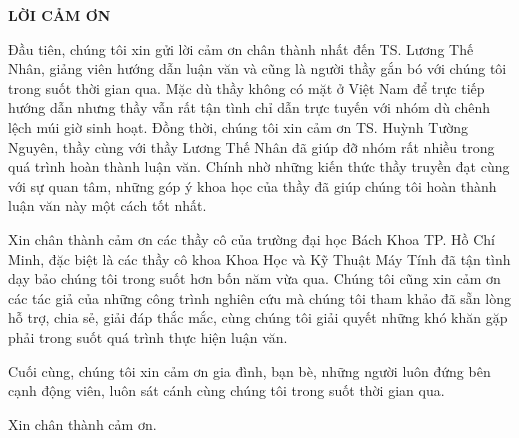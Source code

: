 \begin{titlepage}
\centering
	{\scshape\LARGE \textbf{LỜI CẢM ƠN} \par}
	\vspace{1cm}
	
\begin{flushleft}
Đầu tiên, chúng tôi xin gửi lời cảm ơn chân thành nhất đến TS. Lương Thế Nhân, giảng viên
hướng dẫn luận văn và cũng là người thầy gắn bó với chúng tôi trong suốt thời gian qua. Mặc dù thầy không có mặt ở Việt Nam để trực tiếp hướng dẫn nhưng thầy vẫn rất tận tình chỉ dẫn trực tuyến với nhóm dù chênh lệch múi giờ sinh hoạt. Đồng thời, chúng tôi xin cảm ơn TS. Huỳnh Tường Nguyên, thầy cùng với thầy Lương Thế Nhân đã giúp đỡ nhóm rất nhiều trong quá trình hoàn thành luận văn. Chính nhờ những kiến thức thầy truyền đạt cùng với sự quan tâm, những góp ý khoa học của thầy đã giúp chúng tôi hoàn thành luận văn
này một cách tốt nhất.  \par

Xin chân thành cảm ơn các thầy cô của trường đại học Bách Khoa TP. Hồ Chí Minh, đặc biệt
là các thầy cô khoa Khoa Học và Kỹ Thuật Máy Tính đã tận tình dạy bảo chúng tôi trong suốt
hơn bốn năm vừa qua. Chúng tôi cũng xin cảm ơn các tác giả của những công trình nghiên cứu mà chúng tôi tham khảo đã sẵn lòng hỗ trợ, chia sẻ, giải đáp thắc mắc, cùng chúng
tôi giải quyết những khó khăn gặp phải trong suốt quá trình thực hiện luận văn.\par

Cuối cùng, chúng tôi xin cảm ơn gia đình, bạn bè, những người luôn đứng bên cạnh động
viên, luôn sát cánh cùng chúng tôi trong suốt thời gian qua.\par

Xin chân thành cảm ơn. \par
\end{flushleft}


\vfill %
\end{titlepage}